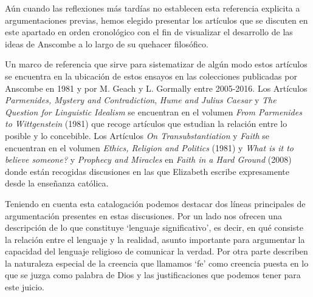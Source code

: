 Aún cuando las reflexiones más tardías no establecen esta referencia explicita a argumentaciones previas, hemos elegido presentar los artículos que se discuten en este apartado en orden cronológico con el fin de visualizar el desarrollo de las ideas de Anscombe a lo largo de su quehacer filosófico. 

Un marco de referencia que sirve para sistematizar de algún modo estos artículos se encuentra en la ubicación de estos ensayos en las colecciones publicadas por Anscombe en 1981 y por M. Geach y L. Gormally entre 2005-2016. Los Artículos \emph{Parmenides, Mystery and Contradiction}, \emph{Hume and Julius Caesar} y \emph{The Question for Linguistic Idealism} se encuentran en el volumen \emph{From Parmenides to Wittgenstein} (1981) que recoge artículos que estudian la relación entre lo posible y lo concebible. Los Artículos \emph{On Transubstantiation} y \emph{Faith} se encuentran en el volumen \emph{Ethics, Religion and Politics} (1981) y \emph{What is it to believe someone?} y \emph{Prophecy and Miracles} en \emph{Faith in a Hard Ground} (2008) donde están recogidas discusiones en las que Elizabeth escribe expresamente desde la enseñanza católica. 

Teniendo en cuenta esta catalogación podemos destacar dos líneas principales de argumentación presentes en estas discusiones. Por un lado nos ofrecen una descripción de lo que constituye `lenguaje significativo', es decir, en qué consiste la relación entre el lenguaje y la realidad, asunto importante para argumentar la capacidad del lenguaje religioso de comunicar la verdad. Por otra parte describen la naturaleza especial de la creencia que llamamos `fe' como creencia puesta en lo que se juzga como palabra de Dios y las justificaciones que podemos tener para este juicio.
